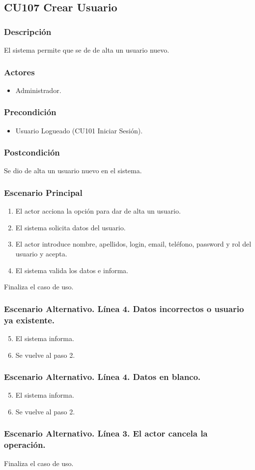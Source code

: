 \subsection{CU107 Crear Usuario}
\subsubsection{Descripci\'{o}n}
El sistema permite que se de de alta un usuario nuevo.
\subsubsection{Actores}
\begin{itemize}
\item Administrador.
\end{itemize}
\subsubsection{Precondici\'{o}n}
\begin{itemize}
\item Usuario Logueado (CU101 Iniciar Sesi\'{o}n).
\end{itemize}
\subsubsection{Postcondici\'{o}n}
Se dio de alta un usuario nuevo en el sistema.
\subsubsection{Escenario Principal}
\begin{enumerate}
\item El actor acciona la opci\'{o}n para dar de alta un usuario.
\item El sistema solicita datos del usuario.
\item El actor introduce nombre, apellidos, login, email, tel\'{e}fono, password y rol del usuario y acepta.
\item El sistema valida los datos e informa.
\end{enumerate}
Finaliza el caso de uso.
\subsubsection{Escenario Alternativo. L\'{i}nea 4. Datos incorrectos o usuario ya existente.}
\begin{enumerate}
\setcounter{enumi}{4}
\item El sistema informa.
\item Se vuelve al paso 2.
\end{enumerate}
\subsubsection{Escenario Alternativo. L\'{i}nea 4. Datos en blanco.}
\begin{enumerate}
\setcounter{enumi}{4}
\item El sistema informa.
\item Se vuelve al paso 2.
\end{enumerate}
\subsubsection{Escenario Alternativo. L\'{i}nea 3. El actor cancela la operaci\'{o}n.}
Finaliza el caso de uso.
